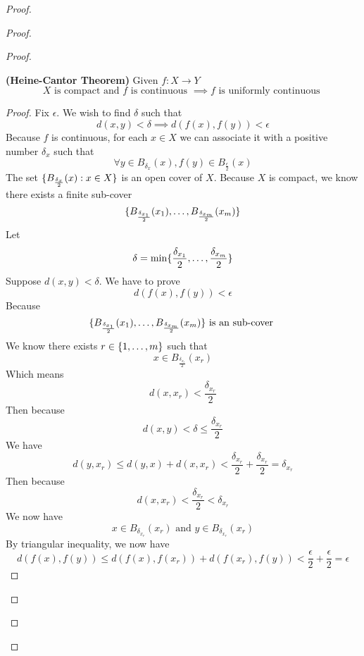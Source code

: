 \documentclass{report}
\begin{document}
\begin{proof}
\begin{proof}
\begin{proof}
\begin{theorem}
\label{5.4.1}
\textbf{(Heine-Cantor Theorem)} Given $f:X\rightarrow Y$
\begin{equation*}
X\text{ is compact and  }f\text{ is continuous }\implies f\text{ is uniformly continuous }
\end{equation*}
\end{theorem}
\begin{proof}
Fix $\epsilon $. We wish to find $\delta$ such that 
\begin{equation*}
d(x,y)<\delta \implies d(f(x),f(y))<\epsilon 
\end{equation*}
Because $f$ is continuous, for each $x\in X$ we can associate it with a positive number $\delta_x$ such that 
\begin{equation*}
\forall y\in B_{\delta_x}(x), f(y) \in B_{\frac{\epsilon}{2}}(x)
\end{equation*}
The set $\{ B_{\frac{\delta_x}{2}}(x):x\in X \}$ is an open cover of $X$. Because  $X$ is compact, we know there exists a finite sub-cover
\begin{equation*}
\{ B_{\frac{\delta_{x_1}}{2}}(x_1),\dots ,B_{\frac{\delta_{x_m}}{2}}(x_m) \}
\end{equation*}
Let 
\begin{equation*}
\delta=\min \{ \frac{\delta_{x_1}}{2},\dots , \frac{\delta_{x_m}}{2} \}
\end{equation*}
Suppose $d(x,y)<\delta$. We have to prove
\begin{equation*}
d(f(x),f(y))<\epsilon 
\end{equation*}
Because 
\begin{equation*}
\{ B_{\frac{\delta_{x_1}}{2}}(x_1),\dots ,B_{\frac{\delta_{x_m}}{2}}(x_m) \}\text{ is an sub-cover }
\end{equation*}
We know there exists $r\in \{ 1,\dots ,m \}$ such that 
\begin{equation*}
x\in B_{\frac{\delta_{x_r}}{2}}(x_r)
\end{equation*}
Which means 
\begin{equation*}
d(x,x_r)<\frac{\delta_{x_r}}{2}
\end{equation*}
Then because 
 \begin{equation*}
d(x,y)<\delta \leq \frac{\delta_{x_r}}{2}
\end{equation*}
We have 
\begin{equation*}
d(y,x_r)\leq d(y,x)+d(x,x_r)<\frac{\delta_{x_r}}{2}+\frac{\delta_{x_r}}{2}=\delta_{x_r}
\end{equation*}
Then because 
\begin{equation*}
d(x,x_r)<\frac{\delta_{x_r}}{2}<\delta_{x_r}
\end{equation*}
We now have
\begin{equation*}
x\in B_{\delta_{x_r}}(x_r)\text{ and }y\in B_{\delta_{x_r}}(x_r)
\end{equation*}
By triangular inequality, we now have
\begin{equation*}
d(f(x),f(y))\leq d(f(x),f(x_r))+d(f(x_r),f(y))<\frac{\epsilon}{2}+\frac{\epsilon}{2}=\epsilon 
\end{equation*}




\end{proof}
\end{proof}
\end{proof}
\end{proof}
\end{document}
